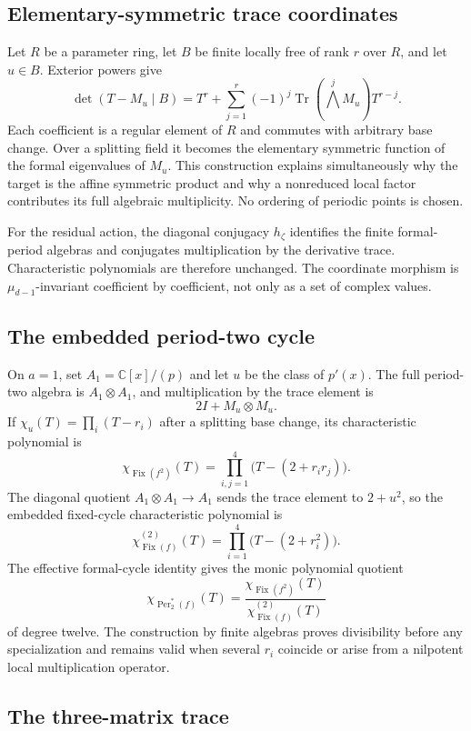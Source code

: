 \documentclass[11pt]{article}
\theoremstyle{definition}
\newcommand{\C}{\mathbb C}
\newcommand{\Tr}{\operatorname{Tr}}
\newcommand{\Fix}{\operatorname{Fix}}
\newcommand{\Per}{\operatorname{Per}}
\begin{document}
\subsection{Elementary-symmetric trace coordinates}

Let $R$ be a parameter ring, let $B$ be finite locally free of rank $r$ over $R$, and let $u\in B$. Exterior powers give
\[
\det(T-M_u\mid B)
=
T^r+\sum_{j=1}^r(-1)^j
\Tr\!\left(\bigwedge^jM_u\right)T^{r-j}.
\]
Each coefficient is a regular element of $R$ and commutes with arbitrary base change. Over a splitting field it becomes the elementary symmetric function of the formal eigenvalues of $M_u$. This construction explains simultaneously why the target is the affine symmetric product and why a nonreduced local factor contributes its full algebraic multiplicity. No ordering of periodic points is chosen.

For the residual action, the diagonal conjugacy $h_\zeta$ identifies the finite formal-period algebras and conjugates multiplication by the derivative trace. Characteristic polynomials are therefore unchanged. The coordinate morphism is $\mu_{d-1}$-invariant coefficient by coefficient, not only as a set of complex values.

\subsection{The embedded period-two cycle}

On $a=1$, set $A_1=\C[x]/(p)$ and let $u$ be the class of $p'(x)$. The full period-two algebra is $A_1\otimes A_1$, and multiplication by the trace element is
\[
2I+M_u\otimes M_u.
\]
If $\chi_u(T)=\prod_i(T-r_i)$ after a splitting base change, its characteristic polynomial is
\[
\chi_{\Fix(f^2)}(T)
=
\prod_{i,j=1}^4\bigl(T-(2+r_ir_j)\bigr).
\]
The diagonal quotient $A_1\otimes A_1\to A_1$ sends the trace element to $2+u^2$, so the embedded fixed-cycle characteristic polynomial is
\[
\chi_{\Fix(f)}^{(2)}(T)
=
\prod_{i=1}^4\bigl(T-(2+r_i^2)\bigr).
\]
The effective formal-cycle identity gives the monic polynomial quotient
\[
\chi_{\Per_2^*(f)}(T)
=
\frac{\chi_{\Fix(f^2)}(T)}{\chi_{\Fix(f)}^{(2)}(T)}
\]
of degree twelve. The construction by finite algebras proves divisibility before any specialization and remains valid when several $r_i$ coincide or arise from a nilpotent local multiplication operator.

\subsection{The three-matrix trace}
\end{document}
